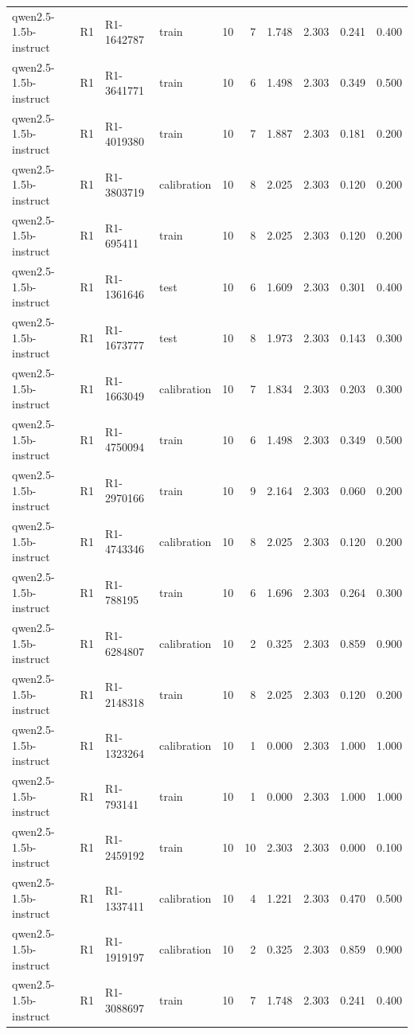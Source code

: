 \begin{table}
\begin{tabular}{llllrrrrrr}
qwen2.5-1.5b-instruct & R1 & R1-1642787 & train & 10 & 7 & 1.748 & 2.303 & 0.241 & 0.400 \\
qwen2.5-1.5b-instruct & R1 & R1-3641771 & train & 10 & 6 & 1.498 & 2.303 & 0.349 & 0.500 \\
qwen2.5-1.5b-instruct & R1 & R1-4019380 & train & 10 & 7 & 1.887 & 2.303 & 0.181 & 0.200 \\
qwen2.5-1.5b-instruct & R1 & R1-3803719 & calibration & 10 & 8 & 2.025 & 2.303 & 0.120 & 0.200 \\
qwen2.5-1.5b-instruct & R1 & R1-695411 & train & 10 & 8 & 2.025 & 2.303 & 0.120 & 0.200 \\
qwen2.5-1.5b-instruct & R1 & R1-1361646 & test & 10 & 6 & 1.609 & 2.303 & 0.301 & 0.400 \\
qwen2.5-1.5b-instruct & R1 & R1-1673777 & test & 10 & 8 & 1.973 & 2.303 & 0.143 & 0.300 \\
qwen2.5-1.5b-instruct & R1 & R1-1663049 & calibration & 10 & 7 & 1.834 & 2.303 & 0.203 & 0.300 \\
qwen2.5-1.5b-instruct & R1 & R1-4750094 & train & 10 & 6 & 1.498 & 2.303 & 0.349 & 0.500 \\
qwen2.5-1.5b-instruct & R1 & R1-2970166 & train & 10 & 9 & 2.164 & 2.303 & 0.060 & 0.200 \\
qwen2.5-1.5b-instruct & R1 & R1-4743346 & calibration & 10 & 8 & 2.025 & 2.303 & 0.120 & 0.200 \\
qwen2.5-1.5b-instruct & R1 & R1-788195 & train & 10 & 6 & 1.696 & 2.303 & 0.264 & 0.300 \\
qwen2.5-1.5b-instruct & R1 & R1-6284807 & calibration & 10 & 2 & 0.325 & 2.303 & 0.859 & 0.900 \\
qwen2.5-1.5b-instruct & R1 & R1-2148318 & train & 10 & 8 & 2.025 & 2.303 & 0.120 & 0.200 \\
qwen2.5-1.5b-instruct & R1 & R1-1323264 & calibration & 10 & 1 & 0.000 & 2.303 & 1.000 & 1.000 \\
qwen2.5-1.5b-instruct & R1 & R1-793141 & train & 10 & 1 & 0.000 & 2.303 & 1.000 & 1.000 \\
qwen2.5-1.5b-instruct & R1 & R1-2459192 & train & 10 & 10 & 2.303 & 2.303 & 0.000 & 0.100 \\
qwen2.5-1.5b-instruct & R1 & R1-1337411 & calibration & 10 & 4 & 1.221 & 2.303 & 0.470 & 0.500 \\
qwen2.5-1.5b-instruct & R1 & R1-1919197 & calibration & 10 & 2 & 0.325 & 2.303 & 0.859 & 0.900 \\
qwen2.5-1.5b-instruct & R1 & R1-3088697 & train & 10 & 7 & 1.748 & 2.303 & 0.241 & 0.400 \\

\end{tabular}
\end{table}
